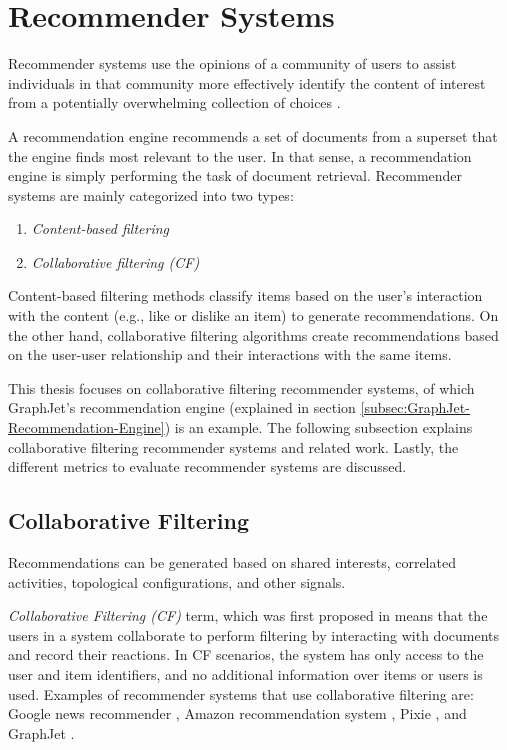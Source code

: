 \section{Recommender Systems}
\label{sec:recommender-systems}

Recommender systems use the opinions of a community of users to assist individuals in that community more effectively identify the content of interest from a potentially overwhelming collection of choices \cite{gunawardanaSurveyAccuracyEvaluation}.

A recommendation engine recommends a set of documents from a superset that the engine finds most relevant to the user. In that sense, a recommendation engine is simply performing the task of document retrieval. Recommender systems are mainly categorized into two types:
\begin{enumerate}
    \item \emph{Content-based filtering}
    \item \emph{Collaborative filtering (CF)}
\end{enumerate}

Content-based filtering methods classify items based on the user's interaction with the content (e.g., like or dislike an item) to generate recommendations. On the other hand, collaborative filtering algorithms create recommendations based on the user-user relationship and their interactions with the same items.


This thesis focuses on collaborative filtering recommender systems, of which GraphJet's recommendation engine \cite{sharmaGraphJetRealtimeContent2016} (explained in section \ref{subsec:GraphJet-Recommendation-Engine}) is an example.
The following subsection explains collaborative filtering recommender systems and related work. Lastly, the different metrics to evaluate recommender systems are discussed.

\subsection{Collaborative Filtering}
\label{subsec:collaborative-filtering}

Recommendations can be generated based on shared interests, correlated activities, topological configurations, and other signals.

\emph{Collaborative Filtering (CF)} term, which was first proposed in \cite{goldbergUsingCollaborativeFiltering1992} means that the users in a system collaborate to perform filtering by interacting with documents and record their reactions.
In CF scenarios, the system has only access to the user and item identifiers, and no additional information over items or users is used.
Examples of recommender systems that use collaborative filtering are: Google news recommender \cite{dasGoogleNewsPersonalization2007}, Amazon recommendation system \cite{lindenAmazonComRecommendations2003}, Pixie \cite{eksombatchaiPixieSystemRecommending2018}, and GraphJet \cite{sharmaGraphJetRealtimeContent2016}.

